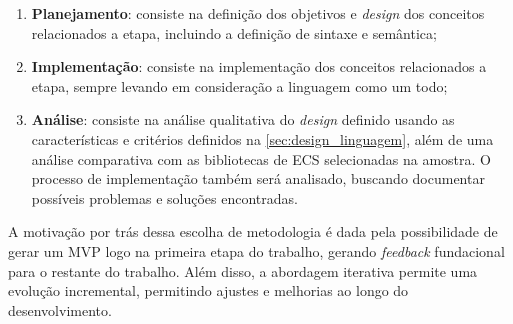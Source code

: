 \begin{enumerate}
    \item \textbf{Planejamento}: consiste na definição dos objetivos e \textit{design} dos conceitos relacionados a etapa, incluindo a definição de sintaxe e semântica;
    \item \textbf{Implementação}: consiste na implementação dos conceitos relacionados a etapa, sempre levando em consideração a linguagem como um todo;
    \item \textbf{Análise}: consiste na análise qualitativa do \textit{design} definido usando as características e critérios definidos na \autoref{sec:design_linguagem}, além de uma análise comparativa com as bibliotecas de ECS selecionadas na amostra. O processo de implementação também será analisado, buscando documentar possíveis problemas e soluções encontradas.
\end{enumerate}

A motivação por trás dessa escolha de metodologia é dada pela possibilidade de gerar um MVP logo na primeira etapa do trabalho, gerando \textit{feedback} fundacional para o restante do trabalho. Além disso, a abordagem iterativa permite uma evolução incremental, permitindo ajustes e melhorias ao longo do desenvolvimento.
